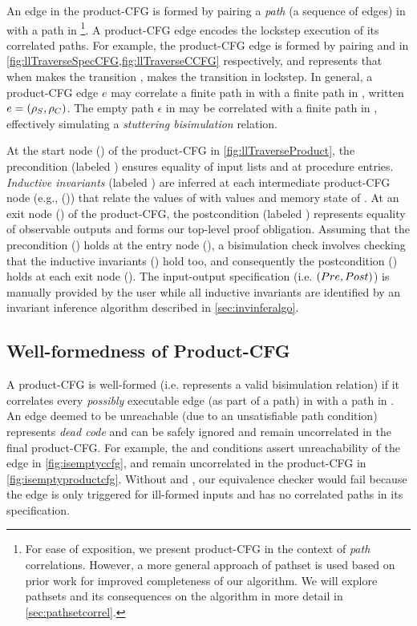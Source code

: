 An edge in the product-CFG is formed by pairing a {\em path} (a sequence of edges) in \sprog{}
with a path in \cprog{}\footnote{
For ease of exposition, we present product-CFG in the context of {\em path} correlations.
However, a more general approach of pathset is used based on prior work \cite{oopsla20}
for improved completeness of our algorithm.
We will explore pathsets and its consequences on the algorithm in more detail in \cref{sec:pathsetcorrel}.}.
A product-CFG edge encodes the lockstep execution of its correlated paths.
For example, the product-CFG edge  is formed by pairing
 and  in \cref{fig:llTraverseSpecCFG,fig:llTraverseCCFG} respectively,
and represents that when \sprog{} makes the transition , \cprog{} makes the transition 
in lockstep.
In general, a product-CFG edge $e$ may correlate a finite path \sv{\rho} in \sprog{} with a finite path
\cv{\rho} in \cprog{}, written $e=({\tt \rho}_{S},{\tt \rho}_{C})$.
The empty path $\epsilon$ in \sprog{} may be correlated with a finite path in \cprog{},
effectively simulating a {\em stuttering bisimulation} relation.

At the start node () of the product-CFG in \cref{fig:llTraverseProduct},
the precondition \pre{} (labeled )
ensures equality of input lists  and  at procedure entries.
{\em Inductive invariants} (labeled ) are inferred
at each intermediate product-CFG node (e.g., ()) that relate
the values of \sprog{} with values and memory state of \cprog{}.
At an exit node () of the product-CFG, the postcondition \post{} (labeled )
represents equality of observable outputs and forms our top-level proof obligation.
Assuming that the precondition \pre{} () holds at the entry node (),
a bisimulation check involves checking that the inductive invariants () hold too,
and consequently the postcondition \post{} () holds at each exit node ().
The input-output specification (i.e. $({Pre}{},{Post}{})$) is manually provided by the user
while all inductive invariants are identified by an invariant inference algorithm described in \cref{sec:invinferalgo}.

\subsection{Well-formedness of Product-CFG}
\label{sec:wellformedproductcfg}
A product-CFG is well-formed (i.e. represents a valid bisimulation relation) if it correlates every {\em possibly} executable
edge (as part of a path) in \cprog{} with a path in \sprog{}.
An edge deemed to be unreachable (due to an unsatisfiable path condition) represents {\em dead code} and can be
safely ignored and remain uncorrelated in the final product-CFG.
For example, the \sdef{} and \pre{} conditions assert unreachability of the edge  in \cref{fig:isemptyccfg},
and remain uncorrelated in the product-CFG in \cref{fig:isemptyproductcfg}.
Without \sdef{} and \pre{}, our equivalence checker would fail because the edge  is only triggered for ill-formed
inputs and has no correlated paths in its specification.


